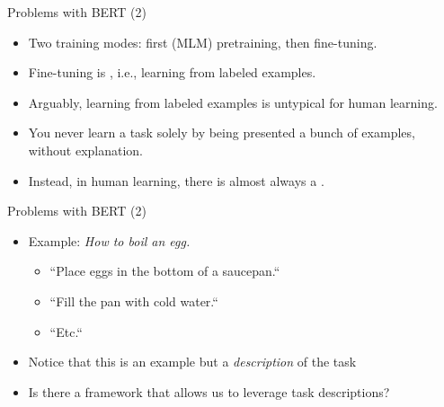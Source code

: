 
\begin{frame}{Problems with BERT (2)}

\vfill
			
\begin{itemize}
\item Two training modes: first (MLM) pretraining, then fine-tuning.
\item Fine-tuning is , i.e., learning from labeled examples.
\item Arguably, learning from labeled examples is untypical for human learning.
\item You never learn a task solely by being presented a bunch of examples, without explanation.
\item Instead, in human learning, there is almost always a .
    \end{itemize}

\vfill

\end{frame}


\begin{frame}{Problems with BERT (2)}

\vfill
			
\begin{itemize}
\item Example: \textit{How to boil an egg.}
		\begin{itemize}
			\item ``Place eggs in the bottom of a saucepan.``
			\item ``Fill the pan with cold water.``
			\item ``Etc.``
		\end{itemize}
\item Notice that this is  an example but a \textit{description} of the task
\item \ques Is there a framework that allows us to leverage task descriptions?
\end{itemize}

\vfill

\end{frame}


